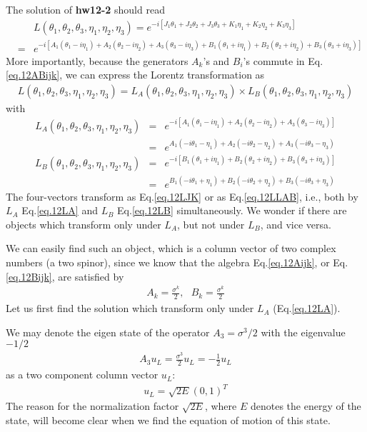 \documentclass[12pt]{article}
\begin{document}
  The solution of {\bf hw12-2} should read
\begin{eqnarray}
    &&L(\theta_1, \theta_2, \theta_3, \eta_1, \eta_2, \eta_3)
  =  e^{-i[ J_1\theta_1 +J_2\theta_2 +J_3\theta_3 +K_1\eta_1 +K_2\eta_2 +K_3\eta_3 ]} \\
  &=& e^{-i[ A_1(\theta_1-i\eta_1) +A_2(\theta_2-i\eta_2) +A_3(\theta_3-i\eta_3)
          +B_1(\theta_1+i\eta_1) +B_2(\theta_2+i\eta_2) +B_3(\theta_3+i\eta_3) ]} \label{eq.12LJK}
\end{eqnarray}
 More importantly, because the generators $A_k$'s and $B_i$'s commute in Eq.\ref{eq.12ABijk}, we can express the Lorentz transformation as
\begin{eqnarray}
    L(\theta_1, \theta_2, \theta_3, \eta_1, \eta_2, \eta_3)
   = L_A(\theta_1, \theta_2, \theta_3, \eta_1, \eta_2, \eta_3)
   \times L_B(\theta_1, \theta_2, \theta_3, \eta_1, \eta_2, \eta_3) \label{eq.12LLAB}
\end{eqnarray}
with
\begin{eqnarray}
    L_A(\theta_1, \theta_2, \theta_3, \eta_1, \eta_2, \eta_3)
  &=& e^{-i[ A_1(\theta_1-i\eta_1) +A_2(\theta_2-i\eta_2) +A_3(\theta_3-i\eta_3) ]} \\
  &=& e^{ A_1 (-i\theta_1-\eta_1) +A_2 (-i\theta_2-\eta_2) +A_3(-i\theta_3-\eta_3) } \label{eq.12LA}
\end{eqnarray}
\begin{eqnarray}
    L_B(\theta_1, \theta_2, \theta_3, \eta_1, \eta_2, \eta_3)
  &=& e^{-i[B_1(\theta_1+i\eta_1) +B_2(\theta_2+i\eta_2) +B_3(\theta_3+i\eta_3)]} \\
  &=& e^{ B_1 (-i\theta_1+\eta_1) +B_2 (-i\theta_2+\eta_2) +B_3(-i\theta_3+\eta_3) } \label{eq.12LB}
\end{eqnarray}
  The four-vectors transform as Eq.\ref{eq.12LJK} or as Eq.\ref{eq.12LLAB}, i.e., both by $L_A$ Eq.\ref{eq.12LA} and $L_B$ Eq.\ref{eq.12LB} simultaneously. We wonder if there are objects which
  transform only under $L_A$, but not under $L_B$, and vice versa.

  We can easily find such an object, which is a column vector of two
  complex numbers (a two spinor), since we know that the algebra
  Eq.\ref{eq.12Aijk}, or Eq.\ref{eq.12Bijk}, are satisfied by
\begin{eqnarray}
    A_k = \frac{\sigma^k}{2}, ~~~ B_k = \frac{\sigma^k}{2}
\end{eqnarray}
 Let us first find the solution which transform only under $L_A$ (Eq.\ref{eq.12LA}).

  We may denote the eigen state of the operator $A_3 = \sigma^3/2$ with
  the eigenvalue $-1/2$
\begin{eqnarray}
  A_3 u_L = \frac{\sigma^3}{2} u_L = -\frac{1}{2} u_L \label{eq.12A3}
\end{eqnarray}
  as a two component column vector $u_L$:
\begin{eqnarray}
  u_L = \sqrt{2E} (0,1)^T \label{eq.12ul}
\end{eqnarray}
   The reason for the normalization factor $\sqrt{2E}$, where $E$ denotes
  the energy of the state, will become clear when we find the equation
  of motion of this state.
\end{document}
